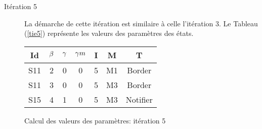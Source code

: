 \begin{Exemple}
\begin{description}
\item[Itération 5] La démarche de cette itération est similaire à celle l'itération 3. Le Tableau (\ref{tie5}) représente les valeurs des paramètres  des états.
\begin{tableth}
	\centering
	\begin{tabular}{|*{7}{c|}}
		\hline
		Id&$\beta{}$&	$\gamma{}$	&$\gamma m{}$ &	I&	M&	T\\ \hline
		S11&	2&	0&	0&	5&	M1&	Border\\ \hline
		S11&	3&	0&	0&	5&	M3&	Border\\ \hline
		S15&	4&	1&	0&	5&	M3&	Notifier\\ \hline
	\end{tabular}
	\caption{Calcul des valeurs des paramètres: itération 5}\label{tie5}
\end{tableth}

\end{description}	
\end{Exemple}